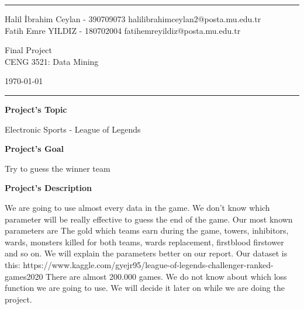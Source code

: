 \documentclass[a4paper]{article}
\begin{document}

\pagebreak
\fancyhead[C]{}
\hrule \medskip %
\begin{minipage}{0.295\textwidth} 
\raggedright
\footnotesize
Halil İbrahim Ceylan - 390709073  halilibrahimceylan2@posta.mu.edu.tr\hfill\\   
Fatih Emre YILDIZ - 180702004  fatihemreyildiz@posta.mu.edu.tr\hfill\\
\end{minipage}
\begin{minipage}{0.4\textwidth} 
\centering 
\large 
Final Project\\ 
\normalsize 
CENG 3521: Data Mining\\ 
\end{minipage}
\begin{minipage}{0.295\textwidth} 
\raggedleft
\today\hfill\\
\end{minipage}
\medskip\hrule 
\bigskip

\bigskip
\bigskip

{\centering\LARGE\bfseries
  Project's Topic\par
}
\medskip
{\centering\large
  Electronic Sports - League of Legends\par
}
\bigskip
\bigskip

{\centering\LARGE\bfseries
  Project's Goal\par
}
\medskip
{\centering\large
  Try to guess the winner team\par
}
\bigskip
\bigskip

{\centering\LARGE\bfseries
  Project's Description\par
}
\medskip
{\centering\large
  We are going to use almost every data in the game. We don't know which parameter will be really effective to guess the end of the game. Our most known parameters are The gold which teams earn during the game, towers, inhibitors, wards, monsters killed for both teams, wards replacement, firstblood firstower and so on. We will explain the parameters better on our report. Our dataset is this: https://www.kaggle.com/gyejr95/league-of-legends-challenger-ranked-games2020 There are almost 200.000 games. We do not know about which loss function we are going to use. We will decide it later on while we are doing the project.\par
}
\bigskip
\bigskip
\end{document}
